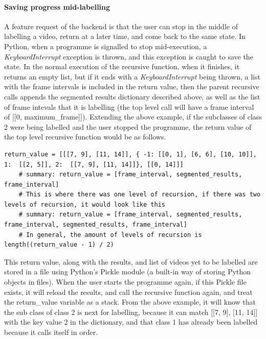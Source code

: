     \paragraph{Saving progress mid-labelling}
    A feature request of the backend is that the user can stop in the middle of labelling a video, return at a later time, and come back to the same state. In Python, when a programme is signalled to stop mid-execution, a {\slshape KeyboardInterrupt} exception is thrown, and this exception is caught to save the state. In the normal execution of the recursive function, when it finishes, it returns an empty list, but if it ends with a {\slshape KeyboardInterrupt} being thrown, a list with the frame intervals is included in the return value, then the parent recursive calls appends the segmented results dictionary described above, as well as the list of frame intevals that it is labelling (the top level call will have a frame interval of [[0, maximum\_frame]]). Extending the above example, if the subclasses of class 2 were being labelled and the user stopped the programme, the return value of the top level recursive function would be as follows.

    \begin{lstlisting}[style=PythonStyle]
    return_value = [[[7, 9], [11, 14]], { -1: [[0, 1], [6, 6], [10, 10]], 1:  [[2, 5]], 2:  [[7, 9], [11, 14]]}, [[0, 14]]]
    # summary: return_value = [frame_interval, segmented_results, frame_interval]
    # This is where there was one level of recursion, if there was two levels of recursion, it would look like this
    # summary: return_value = [frame_interval, segmented_results, frame_interval, segmented_results, frame_interval]
    # In general, the amount of levels of recursion is length((return_value - 1) / 2)\end{lstlisting}

    This return value, along with the results, and list of videos yet to be labelled are stored in a file using Python's Pickle module (a built-in way of storing Python objects in files). When the user starts the programme again, if this Pickle file exists, it will reload the results, and call the recursive function again, and treat the return\_value variable as a stack. From the above example, it will know that the sub class of class 2 is next for labelling, because it can match [[7, 9], [11, 14]] with the key value 2 in the dictionary, and that class 1 has already been labelled because it calls itself in order.

